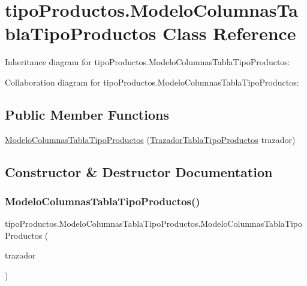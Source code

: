 \hypertarget{classtipo_productos_1_1_modelo_columnas_tabla_tipo_productos}{}\section{tipo\+Productos.\+Modelo\+Columnas\+Tabla\+Tipo\+Productos Class Reference}
\label{classtipo_productos_1_1_modelo_columnas_tabla_tipo_productos}


Inheritance diagram for tipo\+Productos.\+Modelo\+Columnas\+Tabla\+Tipo\+Productos\+:


Collaboration diagram for tipo\+Productos.\+Modelo\+Columnas\+Tabla\+Tipo\+Productos\+:
\subsection*{Public Member Functions}
\begin{DoxyCompactItemize}
\item 
\mbox{\hyperlink{classtipo_productos_1_1_modelo_columnas_tabla_tipo_productos_ab34d4bdf545b10446daa43a9d9e5cd12}{Modelo\+Columnas\+Tabla\+Tipo\+Productos}} (\mbox{\hyperlink{classtipo_productos_1_1_trazador_tabla_tipo_productos}{Trazador\+Tabla\+Tipo\+Productos}} trazador)
\end{DoxyCompactItemize}


\subsection{Constructor \& Destructor Documentation}
\mbox{\label{classtipo_productos_1_1_modelo_columnas_tabla_tipo_productos_ab34d4bdf545b10446daa43a9d9e5cd12}} 
\subsubsection{\texorpdfstring{Modelo\+Columnas\+Tabla\+Tipo\+Productos()}{ModeloColumnasTablaTipoProductos()}}
{\footnotesize\ttfamily tipo\+Productos.\+Modelo\+Columnas\+Tabla\+Tipo\+Productos.\+Modelo\+Columnas\+Tabla\+Tipo\+Productos (\begin{DoxyParamCaption}\item[{\mbox{\hyperlink{classtipo_productos_1_1_trazador_tabla_tipo_productos}{Trazador\+Tabla\+Tipo\+Productos}}}]{trazador }\end{DoxyParamCaption})\hspace{0.3cm}{\ttfamily [inline]}}

